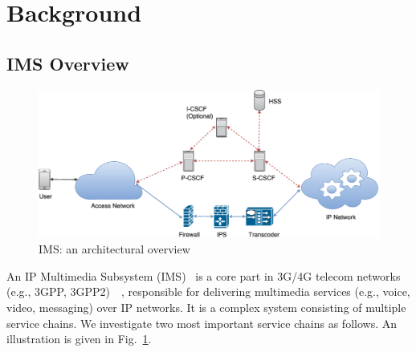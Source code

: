 \section{Background} \label{Background}
\subsection{IMS Overview}

\begin{figure}[!h]
        \centering
        \includegraphics[width=1\columnwidth]{chap-scalims/figure/IMS_architecture.eps}
        \caption{IMS: an architectural overview}
        \label{fig:IMS_architecture}
\end{figure}

An IP Multimedia Subsystem (IMS)~\cite{3gpp-ims} is a core part in 3G/4G telecom networks (e.g., 3GPP, 3GPP2)~\cite{umts}~\cite{lte}, responsible for delivering multimedia services (e.g., voice, video, messaging) over IP networks. It is a complex system consisting of multiple service chains. We investigate two most important service chains as follows. An illustration is given in Fig.~\ref{fig:IMS_architecture}.


